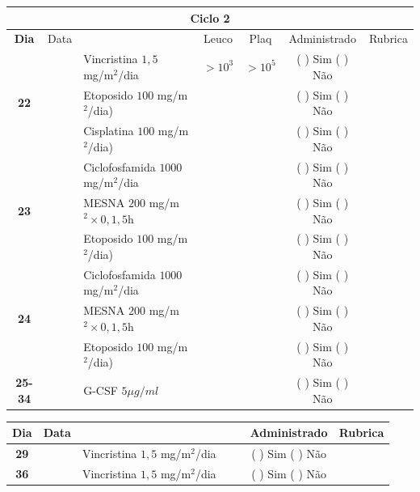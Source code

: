 \documentclass[11pt,a4paper,oldfontcommands]{memoir}
\begin{document}
\begin{center}
\begin{longtable}{p{1cm}c|p{5cm}|p{1.5cm}p{1.5cm}|c|c}
	\hline
	\multicolumn{7}{c}{Ciclo 2} \\
	\hline
	\multicolumn{1}{c|}{\multirow{1}{*}{\textbf{Dia}}}&{Data}&{}&\multicolumn{1}{c|}{Leuco}&\multicolumn{1}{c|}{Plaq}&{Administrado}&{Rubrica} \\
    \hline
    \multicolumn{1}{c|}{\multirow{3}{*}{\textbf{22}}}&&{Vincristina \(1,5\) mg/m\(^2\)/dia}&\multicolumn{1}{c|}{\(>10^3\)}&\multicolumn{1}{c|}{\(>10^5\)}&{(  ) Sim (  ) Não}&\\
    \cline{4-5}
    \multicolumn{1}{c|}{}&&{Etoposido \(100\) mg/m\(^2\)/dia)}&&&{(  ) Sim (  ) Não}&\\
    \cline{4-5}
    \multicolumn{1}{c|}{}&\multirow{1}{*}{}&{Cisplatina \(100\) mg/m\(^2\)/dia)}&&&{(  ) Sim (  ) Não}&\\
    \hline
    \multicolumn{1}{c|}{\multirow{3}{*}{\textbf{23}}}&&{Ciclofosfamida \(1000\) mg/m\(^2\)/dia}&{}&&{(  ) Sim (  ) Não}&\\
    \multicolumn{1}{c|}{}&&{MESNA \(200\) mg/m\(^2 \times 0,1,5\)h}&&&{(  ) Sim (  ) Não}&\\
    \multicolumn{1}{c|}{}&&{Etoposido \(100\) mg/m\(^2\)/dia)}&&&{(  ) Sim (  ) Não}&\\
    \hline
    \multicolumn{1}{c|}{\multirow{3}{*}{\textbf{24}}}&&{Ciclofosfamida \(1000\) mg/m\(^2\)/dia}&{}&&{(  ) Sim (  ) Não}&\\
    \multicolumn{1}{c|}{}&&{MESNA \(200\) mg/m\(^2 \times 0,1,5\)h}&&&{(  ) Sim (  ) Não}&\\
    \multicolumn{1}{c|}{}&\multirow{1}{*}{}&{Etoposido \(100\) mg/m\(^2\)/dia)}&{}&&{(  ) Sim (  ) Não}&\\
    \hline
    \multicolumn{1}{c|}{\textbf{25-34}}&&{G-CSF \(5 \mu g/ml\) }&&&{(  ) Sim (  ) Não}&\\
    \hline
\end{longtable}
\begin{longtable}{p{1cm}c|p{4cm}|p{2cm}p{2cm}|c|c}
	\hline
	\multicolumn{1}{c|}{\multirow{1}{*}{\textbf{Dia}}}&{Data}&{}&{}&&{Administrado}&{Rubrica} \\
    \hline
    \multicolumn{1}{c|}{\textbf{29}}&&{Vincristina \(1,5\) mg/m\(^2\)/dia}&\multicolumn{1}{c}{}&&{(  ) Sim (  ) Não}&\\
    \hline
    \multicolumn{1}{c|}{\textbf{36}}&&{Vincristina \(1,5\) mg/m\(^2\)/dia}&\multicolumn{1}{c}{}&&{(  ) Sim (  ) Não}&\\
    \hline
\end{longtable}

\end{center}
\end{document}

